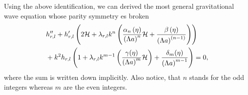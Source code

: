 \documentclass{article}
\begin{document}
Using the above identification, we can derived the most general gravitational wave equation
whose parity symmetry es broken
\begin{align}
    \label{gw pb equation}
    & h''_{r,l} + h'_{r,l}\left(2\mathcal{H} + \lambda_{r,l}k^{n}
    \left(\frac{\alpha_{n}\left(\eta\right)}{\left(\Lambda a\right)^n}\mathcal{H} + 
    \frac{\beta\left(\eta\right)}{\left(\Lambda a\right)^{(n-1)}}\right)\right) \notag \\ 
    & + k^2 h_{r,l}\left(1 + \lambda_{r,l}k^{m-1}
    \left(\frac{\gamma(\eta)}{\left(\Lambda a\right)^m}\mathcal{H}\right) 
    + \frac{\delta_{m}(\eta)}{\left(\Lambda a\right)^{m-1}}\right) = 0,
\end{align}
where the sum is written down implicitly. Also notice, that $n$ stands for the 
odd integers whereas $m$ are the even integers.
\end{document}
